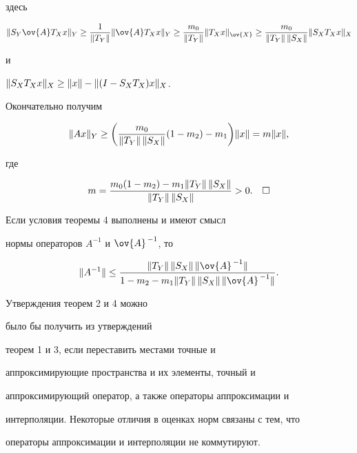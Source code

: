 здесь


$$


\nr{S_Y\ov{A} T_Xx}_Y \ge \frac{1}{\nr{T_Y}}\nr{\ov{A} T_Xx}_Y \ge


\frac{m_0}{\nr{T_Y}}\nr{T_Xx}_{\ov{X}}


\ge \frac{m_0}{\nr{T_Y}\,\nr{S_X}}\nr{S_XT_Xx}_X


$$


и


$\| {S_XT_Xx} \|_X\ge\| {x} \| - \| {(I-S_XT_X)x} \|_X$.


Окончательно получим


$$


\nr{Ax}_Y \ge


\bigg( \frac{m_0}{\nr{T_Y}\,\nr{S_X}}(1-m_2)-m_1\bigg)\nr{x}


= m\nr{x},


$$


где


$$


m = \frac{m_0(1-m_2)-m_1\nr{T_Y}\,\nr{S_X}}{\nr{T_Y}\,\nr{S_X}} > 0.


\quad\square


$$





\begin{cornonum}


Если условия теоремы 4 выполнены и имеют смысл


нормы операторов $A^{-1}$ и $\ov{A}^{\,-1}$, то


$$


\nr{A^{-1}} \le \frac{\nr{T_Y}\,\nr{S_X}\,\nr{\ov{A}^{\,-1}}}


 {1-m_2-m_1\nr{T_Y}\,\nr{S_X}\,\nr{\ov{A}^{\,-1}}}.


$$


\end{cornonum}





\begin{notenonum} Утверждения теорем 2 и 4 можно


было бы получить из утверждений


теорем 1 и 3, если переставить местами точные и


аппроксимирующие пространства и их элементы, точный и


аппроксимирующий оператор, а также операторы аппроксимации и


интерполяции. Некоторые отличия в оценках норм связаны с тем, что


операторы аппроксимации и интерполяции не коммутируют.


\end{notenonum}





